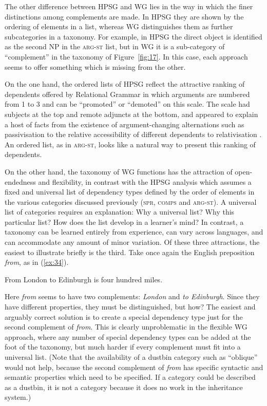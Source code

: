 \documentclass[output=paper
	        ,collection
	        ,collectionchapter
 	        ,biblatex
                ,babelshorthands
                ,newtxmath
                ,draftmode
                ,colorlinks, citecolor=brown
]{./langsci/langscibook}
\begin{document}
The other difference between HPSG and WG lies in the way in which the finer distinctions among complements are made. In HPSG they are shown by the ordering of elements in a list, whereas WG distinguishes them as further subcategories in a taxonomy. For example, in HPSG the direct object is identified as the second NP in the \textsc{arg-st} list, but in WG it is a sub-category of ``complement'' in the taxonomy of Figure~\ref{fig:17}. In this case, each approach seems to offer something which is missing from the other.

On the one hand, the ordered lists of HPSG reflect the attractive ranking of dependents offered by Relational Grammar \citep{PP83a-u,Blake1990} in which arguments are numbered from 1 to 3 and can be ``promoted'' or ``demoted'' on this scale. The scale had subjects at the top and remote adjuncts at the bottom, and appeared to explain a host of facts from the existence of argument-changing alternations such as passivisation \citep{Levin93a-u} to the relative accessibility of different dependents to relativisation \citep{KC77a}. An ordered list, as in \textsc{arg-st}, looks like a natural way to present this ranking of dependents.

On the other hand, the taxonomy of WG functions has the attraction of open-endedness and flexibility, in contrast with the HPSG analysis which assumes a fixed and universal list of dependency types defined by the order of elements in the various categories discussed previously (\textsc{spr}, \textsc{comps} and \textsc{arg-st}). A universal list of categories requires an explanation: Why a universal list? Why this particular list? How does the list develop in a learner’s mind? In contrast, a taxonomy can be learned entirely from experience, can vary across languages, and can accommodate any amount of minor variation. Of these three attractions, the easiest to illustrate briefly is the third. Take once again the English preposition \emph{from}, as in (\ref{ex:34}).

\begin{exe}
	\ex \label{ex:34} From London to Edinburgh is four hundred miles.
\end{exe}

Here \emph{from} seems to have two complements: \emph{London} and \emph{to Edinburgh}. Since they have different properties, they must be distinguished, but how? The easiest and arguably correct solution is to create a special dependency type just for the second complement of \emph{from}. This is clearly unproblematic in the flexible WG approach, where any number of special dependency types can be added at the foot of the taxonomy, but much harder if every complement must fit into a universal list. (Note that the availability of a dustbin category such as ``oblique'' would not help, because the second complement of \emph{from} has specific syntactic and semantic properties which need to be specified. If a category could be described as a dustbin, it is not a category because it does no work in the inheritance system.)
\end{document}
